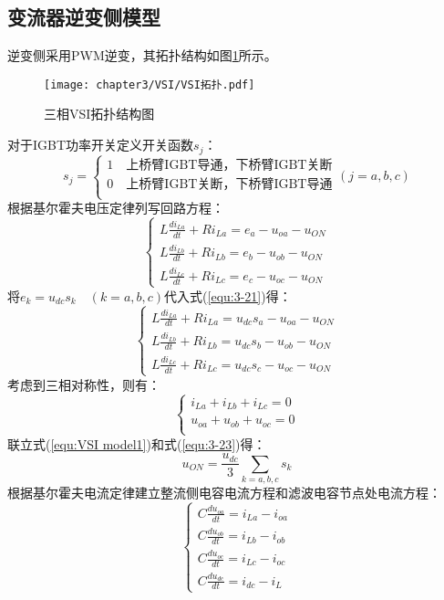 \subsection{变流器逆变侧模型}

逆变侧采用PWM逆变，其拓扑结构如图\ref{fig:三相VSI拓扑结构图}所示。

\begin{figure}[!htp]
	\centering
	\texttt{[image: chapter3/VSI/VSI拓扑.pdf]}
	\caption{三相VSI拓扑结构图}
	\label{fig:三相VSI拓扑结构图}
\end{figure}
对于IGBT功率开关定义开关函数$s_j$：
\begin{equation}
	s_{j} =
	\begin{cases}
		1 \quad \text{上桥臂IGBT导通，下桥臂IGBT关断} \\
		0 \quad \text{上桥臂IGBT关断，下桥臂IGBT导通} \\
	\end{cases}
	(j=a,b,c)
	\label{equ:SkI}
\end{equation}
根据基尔霍夫电压定律列写回路方程：
\begin{equation}
	\begin{cases}
		L \frac{d i_{La}}{dt}+R i_{La}=e_{a}-u_{oa}-u_{ON} \\
		L \frac{d i_{Lb}}{dt}+R i_{Lb}=e_{b}-u_{ob}-u_{ON} \\
		L \frac{d i_{Lc}}{dt}+R i_{Lc}=e_{c}-u_{oc}-u_{ON}
	\end{cases}
	\label{equ:3-21}
\end{equation}
将$e_{k}=u_{dc}s_{k}\quad(k=a,b,c)$代入式(\ref{equ:3-21})得：
\begin{equation}
	\begin{cases}
		L\frac{di_{La}}{dt}+Ri_{La}=u_{dc}s_{a}-u_{oa}-u_{ON} \\
		L\frac{di_{Lb}}{dt}+Ri_{Lb}=u_{dc}s_{b}-u_{ob}-u_{ON} \\
		L\frac{di_{Lc}}{dt}+Ri_{Lc}=u_{dc}s_{c}-u_{oc}-u_{ON}
		\label{equ:VSI model1}
	\end{cases}
\end{equation}
考虑到三相对称性，则有：
\begin{equation}
	\begin{cases}
		i_{La}+i_{Lb}+i_{Lc}=0 \\
		u_{oa}+u_{ob}+u_{oc}=0 \\
	\end{cases}
	\label{equ:3-23}
\end{equation}
联立式(\ref{equ:VSI model1})和式(\ref{equ:3-23})得：
\begin{equation}
	u_{ON}=\frac{u_{dc}}{3}\sum_{k=a,b,c}s_{k}
\end{equation}
根据基尔霍夫电流定律建立整流侧电容电流方程和滤波电容节点处电流方程：
\begin{equation}
	\begin{cases}
		C\frac{du_{oa}}{dt}=i_{La}-i_{oa} \\
		C\frac{du_{ob}}{dt}=i_{Lb}-i_{ob} \\
		C\frac{du_{oc}}{dt}=i_{Lc}-i_{oc} \\
		C\frac{du_{dc}}{dt}=i_{dc}-i_{L}
	\end{cases}
\end{equation}

